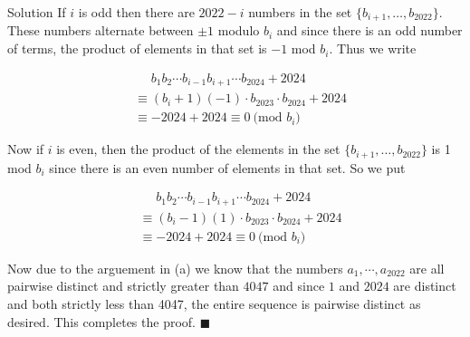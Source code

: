 \documentclass{article}
\begin{document}
\begin{solution}{Solution}
If $i$ is odd then there are $2022 - i$ numbers in the set
$\{ b_{i+1}, \ldots, b_{2022} \}$. These numbers alternate between $\pm 1$
modulo $b_i$ and since there is an odd number of terms, the product of
elements in that set is $-1$ mod $b_i$. Thus we write

\[
\begin{aligned}
&\phantom{\equiv} b_1 b_2 \cdots b_{i-1} b_{i+1} \cdots b_{2024} + 2024\\
&\equiv (b_i + 1)(-1)\cdot b_{2023} \cdot b_{2024} + 2024\\
&\equiv
-2024 + 2024 \equiv 0 \ \text{(mod } b_i)
\end{aligned}
\]

Now if $i$ is even, then the product of the elements in the set
$\{ b_{i+1},\ldots, b_{2022} \}$ is 1 mod $b_i$ since there is an even
number of elements in that set. So we put

\[
\begin{aligned}
&\phantom{\equiv} b_1 b_2 \cdots b_{i-1} b_{i+1} \cdots b_{2024} + 2024\\
&\equiv (b_i - 1)(1)\cdot b_{2023} \cdot b_{2024} + 2024\\
&\equiv
-2024 + 2024 \equiv 0 \ \text{(mod } b_i)
\end{aligned}
\]

Now due to the arguement in (a) we know that the numbers $a_1, \cdots,
a_{2022}$ are all pairwise distinct and strictly greater than $4047$
and since $1$ and $2024$ are distinct and both strictly less than 4047,
the entire sequence is pairwise distinct as desired. This completes the
proof. $\blacksquare$

\end{solution}
\end{document}

